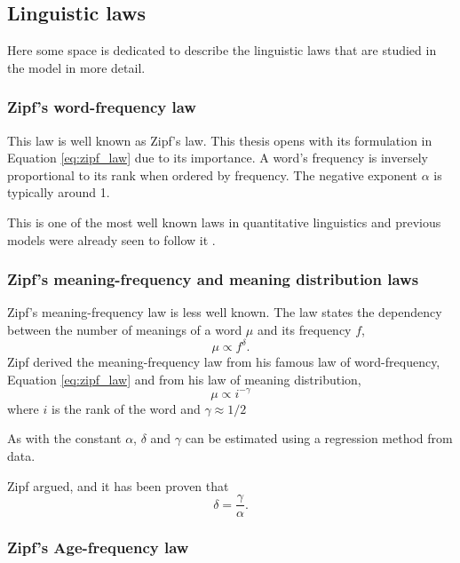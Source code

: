 \subsection{Linguistic laws}
\label{sec:introduction_background_linguistic-laws}

Here some space is dedicated to describe the linguistic laws that are studied in the model in more detail.

\subsubsection{Zipf's word-frequency law}

This law is well known as Zipf's law.
This thesis opens with its formulation in Equation \eqref{eq:zipf_law} due to its importance.
A word's frequency is inversely proportional to its rank when ordered by frequency.
The negative exponent $\alpha$ is typically around 1. \cite{Zipf1949a}

This is one of the most well known laws in quantitative linguistics and previous models were already seen to follow it \cite{Ferrer2003a} \cite{Ferrer2005a}.

\subsubsection{Zipf's meaning-frequency and meaning distribution laws}

Zipf's meaning-frequency law is less well known.
The law states the dependency between the number of meanings of a word $\mu$ and its frequency $f$, \cite{Zipf1949a}
\begin{equation*}
  \mu \propto f^\delta.
\end{equation*}
Zipf derived the meaning-frequency law from his famous law of word-frequency, Equation \eqref{eq:zipf_law} and from his law of meaning distribution,
\begin{equation*}
  \mu \propto i^{-\gamma}
\end{equation*}
where $i$ is the rank of the word and $\gamma \approx 1/2$

As with the constant $\alpha$, $\delta$ and $\gamma$ can be estimated using a regression method from data.

Zipf argued, and it has been proven \cite{Ferrer2016a} that
\begin{equation}
  \label{eq:relation-exponents}
  \delta = \frac{\gamma}{\alpha}.
\end{equation}

\subsubsection{Zipf's Age-frequency law}


